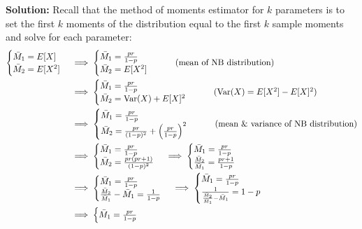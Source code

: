 \documentclass{article}
\DeclareMathOperator{\Var}{Var}
\begin{document}
\noindent\textbf{Solution:} Recall that the method of moments estimator for $k$ parameters is to set the first $k$ moments of the distribution equal to the first $k$ sample moments and solve for each parameter:
\begin{align*}
    \begin{cases}
        \bar M_1=E[X]\\
        \bar M_2=E[X^2]
    \end{cases}
    &\implies
    \begin{cases}
        \bar M_1=\frac{pr}{1-p}\\
        \bar M_2=E[X^2]
    \end{cases}\tag{mean of NB distribution}\\
    &\implies
    \begin{cases}
        \bar M_1=\frac{pr}{1-p}\\
        \bar M_2=\Var(X)+E[X]^2
    \end{cases}\tag{$\Var(X)=E[X^2]-E[X]^2$}\\
    &\implies
    \begin{cases}
        \bar M_1=\frac{pr}{1-p}\\
        \bar M_2=\frac{pr}{(1-p)^2}+\left(\frac{pr}{1-p}\right)^2
    \end{cases}\tag{mean \& variance of NB distribution}\\
    &\implies
    \begin{cases}
        \bar M_1=\frac{pr}{1-p}\\
        \bar M_2=\frac{pr(pr+1)}{(1-p)^2}
    \end{cases}
    \implies
    \begin{cases}
        \bar M_1=\frac{pr}{1-p}\\
        \frac{\bar M_2}{\bar M_1}=\frac{pr+1}{1-p}
    \end{cases}\\
    &\implies
    \begin{cases}
        \bar M_1=\frac{pr}{1-p}\\
        \frac{\bar M_2}{\bar M_1}-\bar M_1=\frac{1}{1-p}
    \end{cases}
    \implies
    \begin{cases}
        \bar M_1=\frac{pr}{1-p}\\
        \frac{1}{\frac{\bar M_2}{\bar M_1}-\bar M_1}=1-p
    \end{cases}\\
    &\implies
    \begin{cases}
        \bar M_1=\frac{pr}{1-p}\\

\end{cases}
\end{align*}
\end{document}
